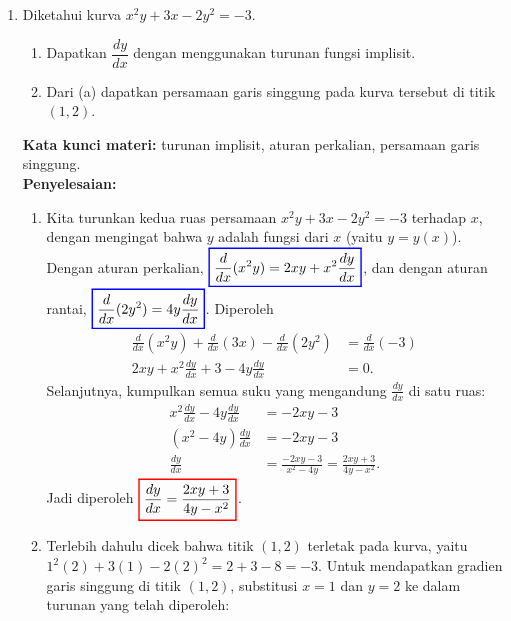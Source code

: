 \documentclass[10pt,openany,a4paper]{article}
\theoremstyle{definition}
\theoremstyle{definition}
\theoremstyle{plain}
\newenvironment{jawab}[2][tes]{%
\par\noindent\textbf{Kata kunci materi:} #1.\\
\textbf{Penyelesaian:} #2%
}{}
\begin{document}
\begin{enumerate}
    \item Diketahui kurva $x^2y+3x-2y^2=-3$.
    \begin{enumerate}
        \item Dapatkan $\dfrac{dy}{dx}$ dengan menggunakan turunan fungsi implisit.
        \item Dari (a) dapatkan persamaan garis singgung pada kurva tersebut di titik $(1,2)$.
    \end{enumerate}
    \begin{jawab}[turunan implisit, aturan perkalian, persamaan garis singgung]{
        \begin{enumerate}
            \item Kita turunkan kedua ruas persamaan $x^2y+3x-2y^2=-3$ terhadap $x$, dengan mengingat bahwa $y$ adalah fungsi dari $x$ (yaitu $y=y(x)$). Dengan aturan perkalian, $\colorlet{oldcolor}{.}
        \color{blue}
        \setlength{\fboxrule}{1pt} \boxed{\color{oldcolor}\frac{d}{dx}(x^2y) = 2xy + x^2\frac{dy}{dx}}\color{oldcolor}$, dan dengan aturan rantai, $\colorlet{oldcolor}{.}
        \color{blue}
        \setlength{\fboxrule}{1pt} \boxed{\color{oldcolor}\frac{d}{dx}(2y^2) = 4y\frac{dy}{dx}}\color{oldcolor}$. Diperoleh
            \begin{align*}
                \frac{d}{dx}(x^2y) + \frac{d}{dx}(3x) - \frac{d}{dx}(2y^2) &= \frac{d}{dx}(-3)\\
                2xy + x^2\frac{dy}{dx} + 3 - 4y\frac{dy}{dx} &= 0.
            \end{align*}
            Selanjutnya, kumpulkan semua suku yang mengandung $\frac{dy}{dx}$ di satu ruas:
            \begin{align*}
                x^2\frac{dy}{dx} - 4y\frac{dy}{dx} &= -2xy - 3\\
                (x^2 - 4y)\frac{dy}{dx} &= -2xy - 3\\
                \frac{dy}{dx} &= \frac{-2xy - 3}{x^2 - 4y} = \frac{2xy+3}{4y-x^2}.
            \end{align*}
            Jadi diperoleh $\colorlet{oldcolor}{.}
        \color{red}
        \setlength{\fboxrule}{1pt} \boxed{\color{oldcolor}\frac{dy}{dx} = \frac{2xy + 3}{4y - x^2}}\color{oldcolor}$.
            \item Terlebih dahulu dicek bahwa titik $(1,2)$ terletak pada kurva, yaitu $1^2(2)+3(1)-2(2)^2=2+3-8=-3$. Untuk mendapatkan gradien garis singgung di titik $(1,2)$, substitusi $x=1$ dan $y=2$ ke dalam turunan yang telah diperoleh:
            \begin{align*}

\end{align*}
\end{enumerate}}
\end{jawab}
\end{enumerate}
\end{document}
